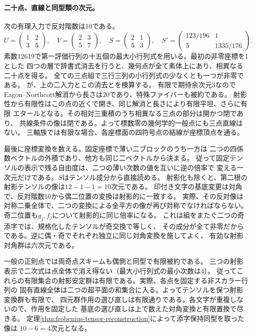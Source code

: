 \paragraph{二十点、直線と同型類の次元。}
次の有理入力で反対階数は10である。
\[
 U=\begin{pmatrix}1&2\\3&5\end{pmatrix},\quad
 V=\begin{pmatrix}2&3\\5&7\end{pmatrix},\quad
 S=\begin{pmatrix}2&1\\5&3\end{pmatrix},\quad
 S'=\begin{pmatrix}123/196&1\\5&1335/176\end{pmatrix}.
\]
素数12619で第一評価行列の十五個の最大小行列式を用いる。最初の非零座標を1とした
四つの層で辞書式消去を行うと、幾何点が全て素体上にあり、相異なる二十点を得る。
全ての三点組で三行三列の小行列式の少なくとも一つが非零である。
が、上の二入力とこの消去とを検算する。
有限で期待余次元3なのでEagon--Northcott解消から長さは20であり、特殊ファイバーも被約である。
射影性から有限性はこの点の近くで開き、同じ解消と長さにより有限平坦、さらに有限
エタールとなる。その相対三重積のうち相異なる三点の部分は開かつ閉であり、
共線条件の像は閉である。よって標数零の幾何学的一般点にも三点直線はない。
三軸族では有限な場合、各座標面の四符号点の結線が座標頂点を通る。

最後に座標変換を数える。固定座標で薄い二ブロックのうち一方は
二つの四係数ベクトルの外積であり、他方も同じ二ベクトルから決まる。
従って固定テンソルの表示で残る自由度は、二つの薄い次数の値を互いに逆の倍率で
変える一次元だけである。$S$はテンソル成分から直接読める。
射影化も除くと、第二根の射影テンソルの像は$12-1-1=10$次元である。
印付き文字の基底変更は対角で、反対階数10から偶二位置の変換は射影的に一致する。
実際、その反対像は対称二乗全体で、二つの変換による全平方の像が再び対称でなければならない。
奇二位置も$g_{\bar j},f_j$について射影的に同じ倍率になる。
これは組をまたぐ二つの奇添字では、規格化したテンソルが奇交換で等しく、
その成分が全て非零だからである。逆に偶・奇でそれぞれ独立に同じ対角変換を施してよく、
有効な射影対角群は六次元である。

一般の正則点では両奇点スキームも偶側と同型で有限被約である。
三つの射影表示で二次式は点全体で消え得ない（最大小行列式の最小次数は4）。
従ってこれらの有限集合の射影安定群は有限である。実際、各点を固定する非スカラー行列の
固有直線全体は二つの超平面の和集合に入る。よってテンソルを保つ射影変換群も有限で、
四元群作用の選び直しは有限通りである。各文字が重複しないので、作用を固定した
基底の選び直しは上で数えた対角変換と有限置換で尽きる。
定理\ref{thm:frobenius-tensor-reconstruction}によって添字保持同型を取った像は
$10-6=4$次元となる。
